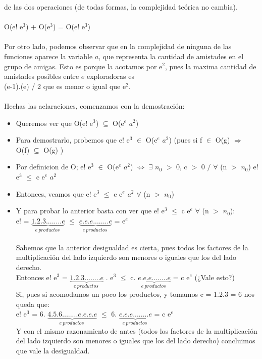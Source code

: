 de las dos operaciones (de todas formas, la complejidad teórica no cambia).\\
\\
O(e! e$^3$) + O(e$^3$) = O(e! e$^3$) \\ \\
Por otro lado, podemos observar que en la complejidad de ninguna de las funciones aparece la variable $a$, que representa la cantidad
de amistades en el grupo de amigas. Esto es porque la acotamos por e$^2$, pues la maxima cantidad de amistades posibles entre $e$
exploradoras es \\ (e-1).(e) / 2 que es menor o igual que e$^2$.\\
\\
Hechas las aclaraciones, comenzamos con la demostración: \\
\begin{itemize}
\item Queremos ver que O(e! e$^3$) $\subseteq$ O(e$^e$ $a^2$)
\item Para demostrarlo, probemos que e! e$^3$ $\in$ O(e$^e$ $a^2$) (pues si f $\in$ O(g) $\Rightarrow$ O(f) $\subseteq$ O(g) )
\item Por definicion de O; e! e$^3$ $\in$ O(e$^e$ $a^2$) $\Leftrightarrow$ $\exists$ $n_{0}$ $>$ 0,  c $>$ 0  $/$ $\forall$ (n $>$ $n_
{0}$) e! e$^3$ $\leq$ c e$^e$ $a^2$ 
\item Entonces, veamos que e! e$^3$ $\leq$ c e$^e$ $a^2$  $\forall$ (n $>$ $n_{0}$)
\item Y para probar lo anterior basta con ver que e! e$^3$ $\leq$ c e$^e$ $\forall$ (n $>$ $n_{0}$): \\
e! = $\underbrace{1.2.3........e}_{e \ productos\;}$ $\leq$ $\underbrace{e.e.e........e}_{e \ productos\;}$ = e$^e$ \\ \\
Sabemos que la anterior desigualdad es cierta, pues todos los factores de la multiplicación del lado izquierdo son menores o iguales que 
los del lado derecho. \\
Entonces e! e$^3$ = $\underbrace{1.2.3........e}_{e \ productos\;}$ .  e$^3$ $\leq$ c. $\underbrace{e.e.e........e}_{e \ productos\;}$ = c e$^e$ (¿Vale esto?) \\
Si, pues si acomodamos un poco los productos, y tomamos c = 1.2.3 = 6 nos queda que: \\
e! e$^3$ = 6. $\underbrace{4.5.6........e.e.e.e}_{e \ productos\;}$ $\leq$ 6. $\underbrace{e.e.e........e}_{e \ productos\;}$ = c e$^e$ \\
Y con el mismo razonamiento de antes (todos los factores de la multiplicación del lado izquierdo son menores o iguales que 
los del lado derecho) concluimos que vale la desigualdad.



\end{itemize}
